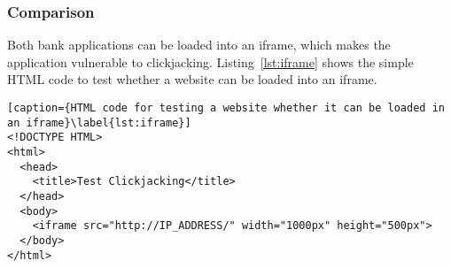 \subsubsection{Comparison}
Both bank applications can be loaded into an iframe, which makes the application vulnerable to clickjacking. Listing~\ref{lst:iframe} shows the simple HTML code to test whether a website can be loaded into an iframe.

\lstset{language=HTML, basicstyle=\footnotesize, frame=single, captionpos=t, linewidth=.9\textwidth, xleftmargin=.12\textwidth}
\begin{lstlisting}[caption={HTML code for testing a website whether it can be loaded in an iframe}\label{lst:iframe}]
<!DOCTYPE HTML>
<html>
  <head>
    <title>Test Clickjacking</title>
  </head>
  <body>
    <iframe src="http://IP_ADDRESS/" width="1000px" height="500px">
  </body>
</html>
\end{lstlisting}
\clearpage